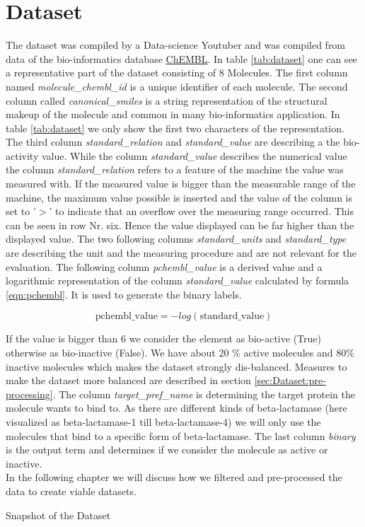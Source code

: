 \documentclass[12pt]{article}
\begin{document}
\section{Dataset}\label{sec:Dataset}
The dataset was compiled by a Data-science Youtuber and was compiled from data of the bio-informatics database \href{https://www.ebi.ac.uk/chembl/}{ChEMBL}. In table \ref{tab:dataset} one can see a representative part of the dataset consisting of 8 Molecules. The first column named \textit{molecule\_chembl\_id} is a unique identifier of each molecule. The second column called \textit{canonical\_smiles} is a string representation of the structural makeup of the molecule and common in many bio-informatics application. In table \ref{tab:dataset} we only show the first two characters of the representation. The third column \textit{standard\_relation} and \textit{standard\_value} are describing a
the bio-activity value. While the column \textit{standard\_value} describes the numerical value the column \textit{standard\_relation} refers to a feature of the machine the value was measured with. If the measured value is bigger than the measurable range of the machine, the maximum value possible is inserted and the value of the column is set to '$>$' to indicate that an overflow over the measuring range occurred. This can be seen in row Nr. six. Hence the value displayed can be far higher than the displayed value. The two following columns \textit{standard\_units} and \textit{standard\_type} are describing the unit and the measuring procedure and are not relevant for the evaluation. The following column \textit{pchembl\_value} is a derived value and a logarithmic representation of the column \textit{standard\_value} calculated by formula \ref{eqn:pchembl}. It is used to generate the binary labels.

\begin{equation}
\label{eqn:pchembl}
\text{pchembl\_value}=-log(\text{standard\_value})
\end{equation}

 If the value is bigger than 6 we consider the element as bio-active (True) otherwise as bio-inactive (False). We have about 20 \% active molecules and 80\% inactive molecules which makes the dataset strongly dis-balanced. Measures to make the dataset more balanced are described in section \ref{sec:Dataset:pre-processing}. The column \textit{target\_pref\_name} is determining the target protein the molecule wants to bind to. As there are different kinds of beta-lactamase (here visualized as beta-lactamase-1 till beta-lactamase-4) we will only use the molecules that bind to a specific form of beta-lactamase. The last column \textit{binary} is the output term and determines if we consider the molecule as active or inactive.\\ In the following chapter we will discuss how we filtered and pre-processed the data to create viable datasets. 
%
\begin{table}[t]
\centering

\caption{Snapshot of the Dataset}
\label{tab:dataset}
\end{table}
%
%
\end{document}
